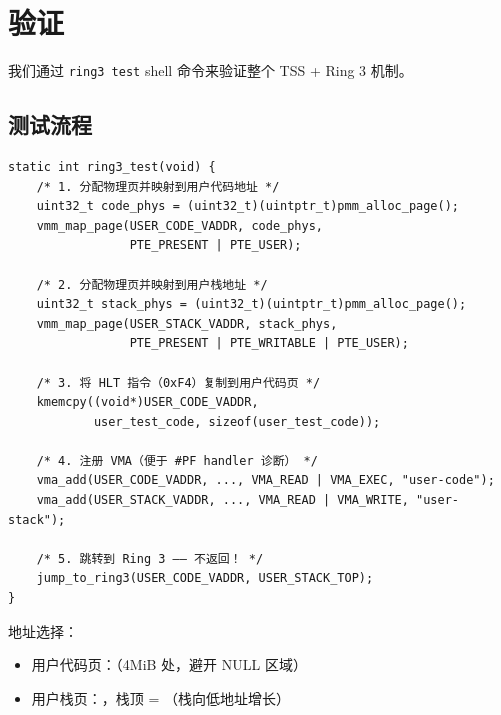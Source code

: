 \section{验证}
\label{sec:tss-verify}

我们通过 \texttt{ring3 test} shell 命令来验证整个 TSS + Ring 3 机制。

\subsection{测试流程}

\begin{lstlisting}[style=cstyle]
static int ring3_test(void) {
    /* 1. 分配物理页并映射到用户代码地址 */
    uint32_t code_phys = (uint32_t)(uintptr_t)pmm_alloc_page();
    vmm_map_page(USER_CODE_VADDR, code_phys,
                 PTE_PRESENT | PTE_USER);

    /* 2. 分配物理页并映射到用户栈地址 */
    uint32_t stack_phys = (uint32_t)(uintptr_t)pmm_alloc_page();
    vmm_map_page(USER_STACK_VADDR, stack_phys,
                 PTE_PRESENT | PTE_WRITABLE | PTE_USER);

    /* 3. 将 HLT 指令（0xF4）复制到用户代码页 */
    kmemcpy((void*)USER_CODE_VADDR,
            user_test_code, sizeof(user_test_code));

    /* 4. 注册 VMA（便于 #PF handler 诊断） */
    vma_add(USER_CODE_VADDR, ..., VMA_READ | VMA_EXEC, "user-code");
    vma_add(USER_STACK_VADDR, ..., VMA_READ | VMA_WRITE, "user-stack");

    /* 5. 跳转到 Ring 3 —— 不返回！ */
    jump_to_ring3(USER_CODE_VADDR, USER_STACK_TOP);
}
\end{lstlisting}

地址选择：

\begin{itemize}
  \item 用户代码页：（4MiB 处，避开 NULL 区域）
  \item 用户栈页：，栈顶 = （栈向低地址增长）
\end{itemize}

